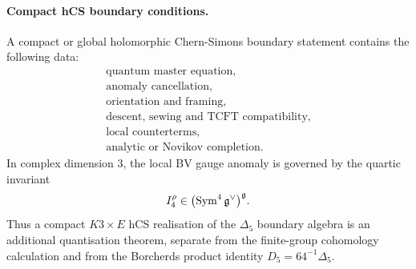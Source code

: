 \paragraph{Compact hCS boundary conditions.}
A compact or global holomorphic Chern-Simons boundary statement contains
the following data:
\[
\begin{array}{l}
\text{quantum master equation},\\
\text{anomaly cancellation},\\
\text{orientation and framing},\\
\text{descent, sewing and TCFT compatibility},\\
\text{local counterterms},\\
\text{analytic or Novikov completion}.
\end{array}
\]
In complex dimension \(3\), the local BV gauge anomaly is governed by
the quartic invariant
\[
I_4^\rho\in {\left(\operatorname{Sym}^4 \mathfrak g^\vee\right)}^{\mathfrak g}.
\]
Thus a compact \(K3\times E\) hCS realisation of the \(\Delta_5\)
boundary algebra is an additional quantisation theorem, separate from
the finite-group cohomology calculation and from the Borcherds product
identity \(D_5=64^{-1}\Delta_5\).
